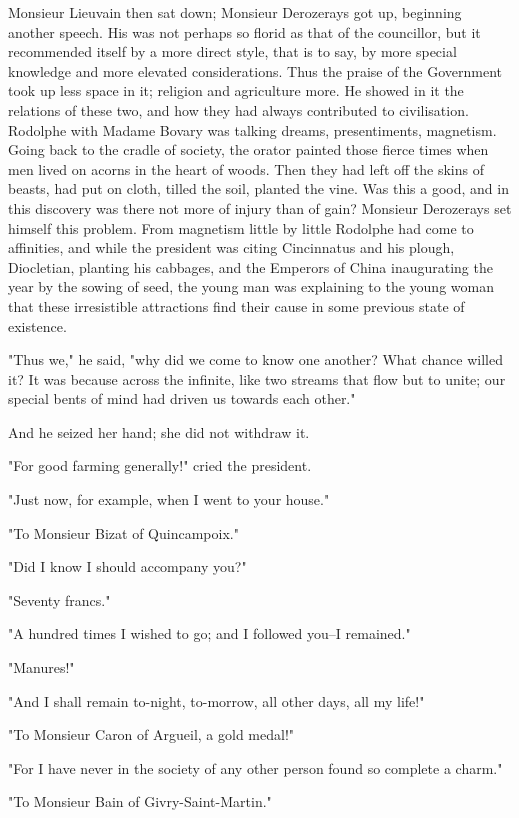 \documentclass[11pt,twocolumn]{ltugboat}
\begin{document}
Monsieur Lieuvain then sat down; Monsieur Derozerays got up, beginning
another speech. His was not perhaps so florid as that of the councillor,
but it recommended itself by a more direct style, that is to say, by
more special knowledge and more elevated considerations. Thus the praise
of the Government took up less space in it; religion and agriculture
more. He showed in it the relations of these two, and how they had
always contributed to civilisation. Rodolphe with Madame Bovary was
talking dreams, presentiments, magnetism. Going back to the cradle of
society, the orator painted those fierce times when men lived on acorns
in the heart of woods. Then they had left off the skins of beasts, had
put on cloth, tilled the soil, planted the vine. Was this a good, and
in this discovery was there not more of injury than of gain? Monsieur
Derozerays set himself this problem. From magnetism little by little
Rodolphe had come to affinities, and while the president was citing
Cincinnatus and his plough, Diocletian, planting his cabbages, and the
Emperors of China inaugurating the year by the sowing of seed, the
young man was explaining to the young woman that these irresistible
attractions find their cause in some previous state of existence.

"Thus we," he said, "why did we come to know one another? What chance
willed it? It was because across the infinite, like two streams that
flow but to unite; our special bents of mind had driven us towards each
other."

And he seized her hand; she did not withdraw it.

"For good farming generally!" cried the president.

"Just now, for example, when I went to your house."

"To Monsieur Bizat of Quincampoix."

"Did I know I should accompany you?"

"Seventy francs."

"A hundred times I wished to go; and I followed you--I remained."

"Manures!"

"And I shall remain to-night, to-morrow, all other days, all my life!"

"To Monsieur Caron of Argueil, a gold medal!"

"For I have never in the society of any other person found so complete a
charm."

"To Monsieur Bain of Givry-Saint-Martin."
\end{document}
